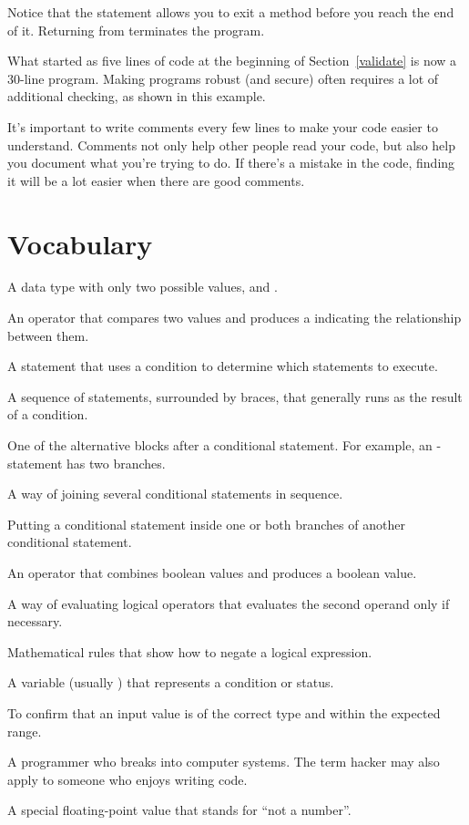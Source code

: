 
Notice that the  statement allows you to exit a method before you reach the end of it.
Returning from  terminates the program.

What started as five lines of code at the beginning of Section~\ref{validate} is now a 30-line program.
Making programs robust (and secure) often requires a lot of additional checking, as shown in this example.


It's important to write comments every few lines to make your code easier to understand.
Comments not only help other people read your code, but also help you document what you're trying to do.
If there's a mistake in the code, finding it will be a lot easier when there are good comments.


\section{Vocabulary}

\begin{description}

A data type with only two possible values,  and .

An operator that compares two values and produces a  indicating the relationship between them.

A statement that uses a condition to determine which statements to execute.

A sequence of statements, surrounded by braces, that generally runs as the result of a condition.

One of the alternative blocks after a conditional statement.
For example, an - statement has two branches.

A way of joining several conditional statements in sequence.

Putting a conditional statement inside one or both branches of another conditional statement.

An operator that combines boolean values and produces a boolean value.

A way of evaluating logical operators that evaluates the second operand only if necessary.

Mathematical rules that show how to negate a logical expression.

A variable (usually ) that represents a condition or status.

To confirm that an input value is of the correct type and within the expected range.

A programmer who breaks into computer systems.
The term hacker may also apply to someone who enjoys writing code.

A special floating-point value that stands for ``not a number''.

\end{description}


